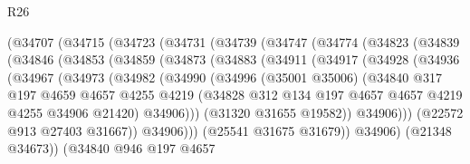 \begin{lexlean}{R26}
\begin{coremodule}
        (@34707
          (@34715
            (@34723
              (@34731
                (@34739
                  (@34747
                    (@34774
                      (@34823
                        (@34839
                          (@34846
                            (@34853
                              (@34859
                                (@34873
                                  (@34883
                                    (@34911
                                      (@34917
                                        (@34928
                                          (@34936
                                            (@34967
                                              (@34973
                                                (@34982
                                                  (@34990
                                                    (@34996
                                                      (@35001 @35006)
                                                      (@34840
                                                        @317
                                                        @197
                                                        @4659
                                                        @4657
                                                        @4255
                                                        @4219
                                                        (@34828
                                                          @312
                                                          @134
                                                          @197
                                                          @4657
                                                          @4657
                                                          @4219
                                                          @4255
                                                          @34906
                                                          @21420)
                                                        @34906)))
                                                  (@31320 @31655 @19582))
                                                @34906)))
                                          (@22572 @913 @27403 @31667))
                                        @34906)))
                                  (@25541 @31675 @31679))
                                @34906)
                              (@21348 @34673))
                            (@34840
                              @946
                              @197
                              @4657

\end{coremodule}
\end{lexlean}
